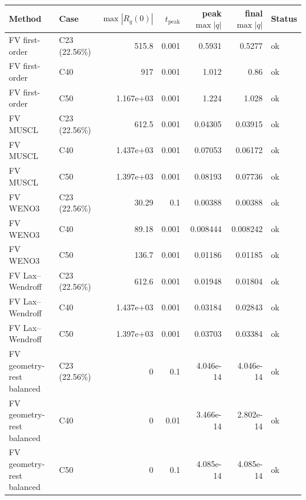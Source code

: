 \begin{tabular}{@{}llrrrrl@{}}
\toprule
Method & Case & $\max |R_q(0)|$ & $t_{\mathrm{peak}}$ & peak $\max |q|$ & final $\max |q|$ & Status \\
\midrule
FV first-order & C23 (22.56\%) & 515.8 & 0.001 & 0.5931 & 0.5277 & ok \\
FV first-order & C40 & 917 & 0.001 & 1.012 & 0.86 & ok \\
FV first-order & C50 & 1.167e+03 & 0.001 & 1.224 & 1.028 & ok \\
FV MUSCL & C23 (22.56\%) & 612.5 & 0.001 & 0.04305 & 0.03915 & ok \\
FV MUSCL & C40 & 1.437e+03 & 0.001 & 0.07053 & 0.06172 & ok \\
FV MUSCL & C50 & 1.397e+03 & 0.001 & 0.08193 & 0.07736 & ok \\
FV WENO3 & C23 (22.56\%) & 30.29 & 0.1 & 0.00388 & 0.00388 & ok \\
FV WENO3 & C40 & 89.18 & 0.001 & 0.008444 & 0.008242 & ok \\
FV WENO3 & C50 & 136.7 & 0.001 & 0.01186 & 0.01185 & ok \\
FV Lax--Wendroff & C23 (22.56\%) & 612.6 & 0.001 & 0.01948 & 0.01804 & ok \\
FV Lax--Wendroff & C40 & 1.437e+03 & 0.001 & 0.03184 & 0.02843 & ok \\
FV Lax--Wendroff & C50 & 1.397e+03 & 0.001 & 0.03703 & 0.03384 & ok \\
FV geometry-rest balanced & C23 (22.56\%) & 0 & 0.1 & 4.046e-14 & 4.046e-14 & ok \\
FV geometry-rest balanced & C40 & 0 & 0.01 & 3.466e-14 & 2.802e-14 & ok \\
FV geometry-rest balanced & C50 & 0 & 0.1 & 4.085e-14 & 4.085e-14 & ok \\
\bottomrule
\end{tabular}
